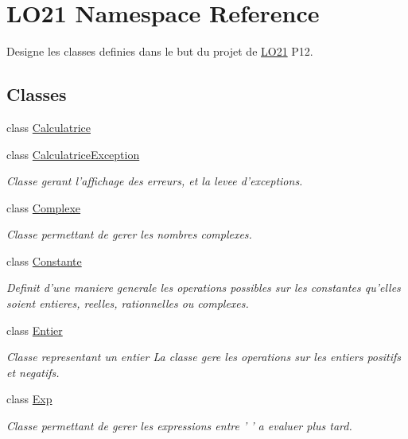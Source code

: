 \hypertarget{namespace_l_o21}{\section{\-L\-O21 \-Namespace \-Reference}
\label{namespace_l_o21}
}


\-Designe les classes definies dans le but du projet de \hyperlink{namespace_l_o21}{\-L\-O21} \-P12.  


\subsection*{\-Classes}
\begin{DoxyCompactItemize}
\item 
class \hyperlink{class_l_o21_1_1_calculatrice}{\-Calculatrice}
\item 
class \hyperlink{class_l_o21_1_1_calculatrice_exception}{\-Calculatrice\-Exception}
\begin{DoxyCompactList}\small\item\em \-Classe gerant l'affichage des erreurs, et la levee d'exceptions. \end{DoxyCompactList}\item 
class \hyperlink{class_l_o21_1_1_complexe}{\-Complexe}
\begin{DoxyCompactList}\small\item\em \-Classe permettant de gerer les nombres complexes. \end{DoxyCompactList}\item 
class \hyperlink{class_l_o21_1_1_constante}{\-Constante}
\begin{DoxyCompactList}\small\item\em \-Definit d'une maniere generale les operations possibles sur les constantes qu'elles soient entieres, reelles, rationnelles ou complexes. \end{DoxyCompactList}\item 
class \hyperlink{class_l_o21_1_1_entier}{\-Entier}
\begin{DoxyCompactList}\small\item\em \-Classe representant un entier \-La classe gere les operations sur les entiers positifs et negatifs. \end{DoxyCompactList}\item 
class \hyperlink{class_l_o21_1_1_exp}{\-Exp}
\begin{DoxyCompactList}\small\item\em \-Classe permettant de gerer les expressions entre ' ' a evaluer plus tard. \end{DoxyCompactList}\item 

\end{DoxyCompactItemize}
